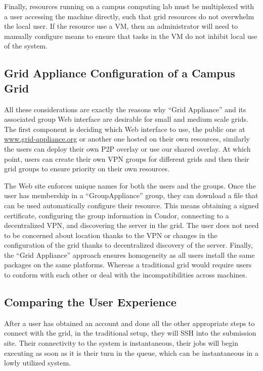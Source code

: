 \documentclass[conference]{IEEEtran}
\begin{document}
Finally, resources running on a campus computing lab must be multiplexed with a
user accessing the machine directly, such that grid resources do not overwhelm
the local user.  If the resource use a VM, then an administrator will need to
manually configure means to ensure that tasks in the VM do not inhibit local
use of the system.

\subsection{Grid Appliance Configuration of a Campus Grid}

All these considerations are exactly the reasons why ``Grid Appliance'' and its
associated group Web interface are desirable for small and medium scale grids.
The first component is deciding which Web interface to use, the public one at
\url{www.grid-appliance.org} or another one hosted on their own resources,
similarly the users can deploy their own P2P overlay or use our shared overlay.
At which point, users can create their own VPN groups for different grids and
then their grid groups to ensure priority on their own resources.

The Web site enforces unique names for both the users and the groups.  Once the
user has membership in a ``GroupAppliance'' group, they can download a file
that can be used automatically configure their resource.  This means obtaining
a signed certificate, configuring the group information in Condor, connecting
to a decentralized VPN, and discovering the server in the grid.  The user does
not need to be concerned about location thanks to the VPN or changes in the
configuration of the grid thanks to decentralized discovery of the server.
Finally, the ``Grid Appliance'' approach ensures homogeneity as all users
install the same packages on the same platforms.  Whereas a traditional grid
would require users to conform with each other or deal with the
incompatibilities across machines.

\subsection{Comparing the User Experience}

After a user has obtained an account and done all the other appropriate steps
to connect with the grid, in the traditional setup, they will SSH into the
submission site.  Their connectivity to the system is instantaneous, their jobs
will begin executing as soon as it is their turn in the queue, which can be
instantaneous in a lowly utilized system.
\end{document}

